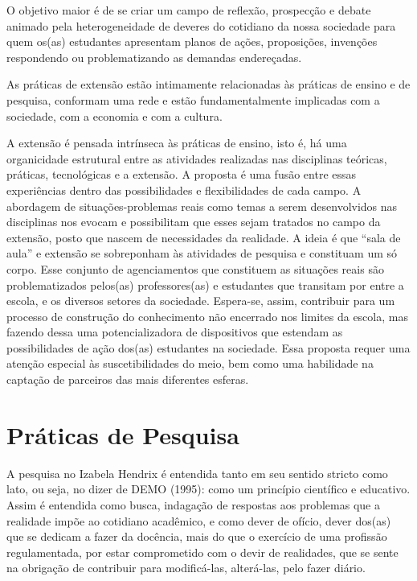 \documentclass[a4paper, 12pt, openright, oneside, german, french, english, brazil]{abntex2}
\begin{document}
O objetivo maior é de se criar um campo de reflexão, prospecção e debate animado pela heterogeneidade de deveres do cotidiano da nossa sociedade para quem os(as) estudantes apresentam planos de ações, proposições, invenções respondendo ou problematizando as demandas endereçadas.

As práticas de extensão estão intimamente relacionadas às práticas de ensino e de pesquisa, conformam uma rede e estão fundamentalmente implicadas com a sociedade, com a economia e com a cultura.

A extensão é pensada intrínseca às práticas de ensino, isto é, há uma organicidade estrutural entre as atividades realizadas nas disciplinas teóricas, práticas, tecnológicas e a extensão. A proposta é uma fusão entre essas experiências dentro das possibilidades e flexibilidades de cada campo. A abordagem de situações-problemas reais como temas a serem desenvolvidos nas disciplinas nos evocam e possibilitam que esses sejam tratados no campo da extensão, posto que nascem de necessidades da realidade. A ideia é que “sala de aula” e extensão se sobreponham às atividades de pesquisa e constituam um só corpo. Esse conjunto de agenciamentos que constituem as situações reais são problematizados pelos(as) professores(as) e estudantes que transitam por entre a escola, e os diversos setores da sociedade. Espera-se, assim, contribuir para um processo de construção do conhecimento não encerrado nos limites da escola, mas fazendo dessa uma potencializadora de dispositivos que estendam as possibilidades de ação dos(as) estudantes na sociedade. Essa proposta requer uma atenção especial às suscetibilidades do meio, bem como uma habilidade na captação de parceiros das mais diferentes esferas.

\chapter{Práticas de Pesquisa}

A pesquisa no Izabela Hendrix é entendida tanto em seu sentido stricto como lato, ou seja, no dizer de DEMO (1995): como um princípio científico e educativo. Assim é entendida como busca, indagação de respostas aos problemas que a realidade impõe ao cotidiano acadêmico, e como dever de ofício, dever dos(as) que se dedicam a fazer da docência, mais do que o exercício de uma profissão regulamentada, por estar comprometido com o devir de realidades, que se sente na obrigação de contribuir para modificá-las, alterá-las, pelo fazer diário.
\end{document}
